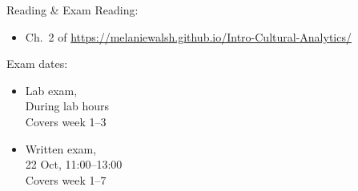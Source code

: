 \documentclass[aspectratio=169,usenames,dvipsnames]{beamer}
\begin{document}
\begin{frame}{Reading \& Exam}
    Reading:
    \begin{itemize}
        \item Ch.~2 of \url{https://melaniewalsh.github.io/Intro-Cultural-Analytics/}
    \end{itemize}

    \vspace{1em}
    Exam dates: 
    \begin{itemize}
        \item Lab exam, \\
            During lab hours \\
            Covers week 1--3
        \item Written exam, \\
            22 Oct, 11:00--13:00 \\
            Covers week 1--7
    \end{itemize}
\end{frame}
\end{document}
